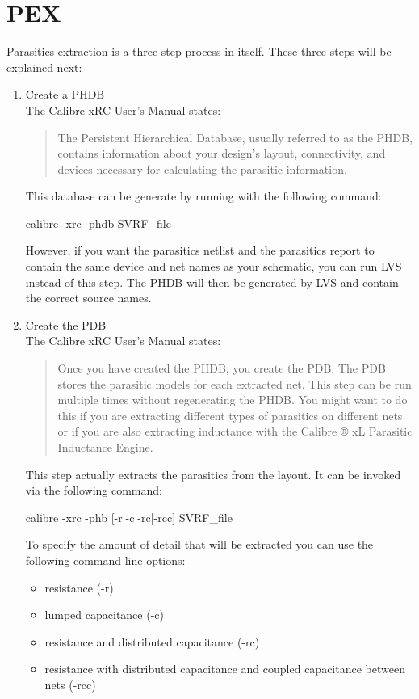 \section{PEX}
Parasitics extraction is a three-step process in itself. These three steps will
be explained next:

\begin{enumerate}
	\item Create a \acrfull{PHDB}\\
		The Calibre xRC User's Manual \citep{calibre2014xrc} states:
		\begin{quote}
The Persistent Hierarchical Database, usually referred to as the PHDB, contains
information about your design’s layout, connectivity, and devices necessary for
calculating the parasitic information.
		\end{quote}
		This database can be generate by running  with the
		following command:
	\begin{lstbashplain}
calibre -xrc -phdb SVRF_file
	\end{lstbashplain}
	However, if you want the parasitics netlist and the parasitics report to
	contain the same device and net names as your schematic, you can run
	\gls{LVS} instead of this step. The \gls{PHDB} will then be generated by
	\gls{LVS} and contain the correct source names.
	\item Create the \acrfull{PDB}\\
		The Calibre xRC User's Manual \citep{calibre2014xrc} states:
		\begin{quote}
Once you have created the PHDB, you create the PDB. The PDB stores the parasitic models for
each extracted net.
This step can be run multiple times without regenerating the PHDB. You might want to do this
if you are extracting different types of parasitics on different nets or if you are also extracting
inductance with the Calibre ® xL Parasitic Inductance Engine.
		\end{quote}
		This step actually extracts the parasitics from the layout. It can be
		invoked via the following command:
	\begin{lstbashplain}
calibre -xrc -phb [-r|-c|-rc|-rcc] SVRF_file
	\end{lstbashplain}

		To specify the amount of detail that will be extracted you can use the
		following command-line options:
		\begin{itemize}
			\item resistance (-r)
			 \item lumped capacitance (-c)
			 \item resistance and distributed capacitance (-rc)
			 \item resistance with distributed capacitance and coupled capacitance between nets (-rcc)
		\end{itemize}


\end{enumerate}
